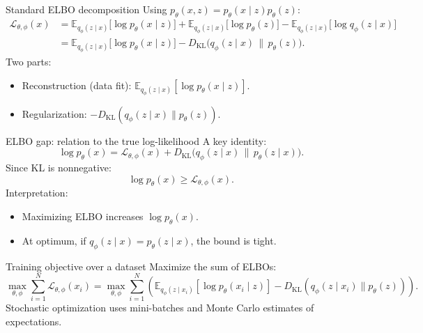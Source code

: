 \documentclass[aspectratio=169]{beamer}
\newcommand{\E}{\mathbb{E}}
\newcommand{\KL}{D_{\mathrm{KL}}}
\newcommand{\cL}{\mathcal{L}}
\begin{document}
\begin{frame}{Standard ELBO decomposition}
Using $p_\theta(x,z)=p_\theta(x\mid z)p_\theta(z)$:
\begin{align*}
\cL_{\theta,\phi}(x)
&= \E_{q_\phi(z\mid x)}\big[\log p_\theta(x\mid z)\big]
+ \E_{q_\phi(z\mid x)}\big[\log p_\theta(z)\big]
- \E_{q_\phi(z\mid x)}\big[\log q_\phi(z\mid x)\big]\\
&= \E_{q_\phi(z\mid x)}\big[\log p_\theta(x\mid z)\big]
- \KL\big(q_\phi(z\mid x)\,\|\,p_\theta(z)\big).
\end{align*}
Two parts:
\begin{itemize}
  \item Reconstruction (data fit): $\E_{q_\phi(z\mid x)}[\log p_\theta(x\mid z)]$.
  \item Regularization: $-\KL(q_\phi(z\mid x)\|p_\theta(z))$.
\end{itemize}
\end{frame}

\begin{frame}{ELBO gap: relation to the true log-likelihood}
A key identity:
\[
\log p_\theta(x)
=
\cL_{\theta,\phi}(x) + \KL\big(q_\phi(z\mid x)\,\|\,p_\theta(z\mid x)\big).
\]
Since KL is nonnegative:
\[
\log p_\theta(x)\ge \cL_{\theta,\phi}(x).
\]
Interpretation:
\begin{itemize}
  \item Maximizing ELBO increases $\log p_\theta(x)$.
  \item At optimum, if $q_\phi(z\mid x)=p_\theta(z\mid x)$, the bound is tight.
\end{itemize}
\end{frame}

\begin{frame}{Training objective over a dataset}
Maximize the sum of ELBOs:
\[
\max_{\theta,\phi} \sum_{i=1}^N \cL_{\theta,\phi}(x_i)
=
\max_{\theta,\phi} \sum_{i=1}^N
\left(
\E_{q_\phi(z\mid x_i)}[\log p_\theta(x_i\mid z)]
-\KL(q_\phi(z\mid x_i)\|p_\theta(z))
\right).
\]
Stochastic optimization uses mini-batches and Monte Carlo estimates of expectations.
\end{frame}
\end{document}

